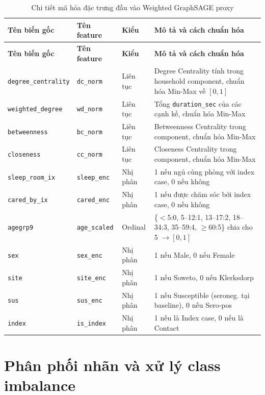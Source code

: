 \documentclass[12pt,a4paper]{report}
\theoremstyle{definition}
\begin{document}
\begin{longtable}{L{3.2cm} L{3.2cm} L{2.0cm} Y}
\caption{Chi tiết mã hóa đặc trưng đầu vào Weighted GraphSAGE proxy}
\label{tab:feature_encoding}\\
\toprule
\textbf{Tên biến gốc} & \textbf{Tên feature} & \textbf{Kiểu} & \textbf{Mô tả và cách chuẩn hóa}\\
\midrule
\endfirsthead
\toprule
\textbf{Tên biến gốc} & \textbf{Tên feature} & \textbf{Kiểu} & \textbf{Mô tả và cách chuẩn hóa}\\
\midrule
\endhead
\bottomrule
\endfoot
\texttt{degree\_centrality} & \texttt{dc\_norm} & Liên tục & Degree Centrality tính trong household component, chuẩn hóa Min-Max về $[0,1]$\\[4pt]
\texttt{weighted\_degree} & \texttt{wd\_norm} & Liên tục & Tổng \texttt{duration\_sec} của các cạnh kề, chuẩn hóa Min-Max\\[4pt]
\texttt{betweenness} & \texttt{bc\_norm} & Liên tục & Betweenness Centrality trong component, chuẩn hóa Min-Max\\[4pt]
\texttt{closeness} & \texttt{cc\_norm} & Liên tục & Closeness Centrality trong component, chuẩn hóa Min-Max\\[4pt]
\texttt{sleep\_room\_ix} & \texttt{sleep\_enc} & Nhị phân & 1 nếu ngủ cùng phòng với index case, 0 nếu không\\[4pt]
\texttt{cared\_by\_ix} & \texttt{cared\_enc} & Nhị phân & 1 nếu được chăm sóc bởi index case, 0 nếu không\\[4pt]
\texttt{agegrp9} & \texttt{age\_scaled} & Ordinal & \{$<$5:0, 5--12:1, 13--17:2, 18--34:3, 35--59:4, $\geq$60:5\} chia cho 5 $\rightarrow [0,1]$\\[4pt]
\texttt{sex} & \texttt{sex\_enc} & Nhị phân & 1 nếu Male, 0 nếu Female\\[4pt]
\texttt{site} & \texttt{site\_enc} & Nhị phân & 1 nếu Soweto, 0 nếu Klerksdorp\\[4pt]
\texttt{sus} & \texttt{sus\_enc} & Nhị phân & 1 nếu Susceptible (seroneg. tại baseline), 0 nếu Sero-pos\\[4pt]
\texttt{index} & \texttt{is\_index} & Nhị phân & 1 nếu là Index case, 0 nếu là Contact\\
\end{longtable}

\section{Phân phối nhãn và xử lý class imbalance}
\end{document}
